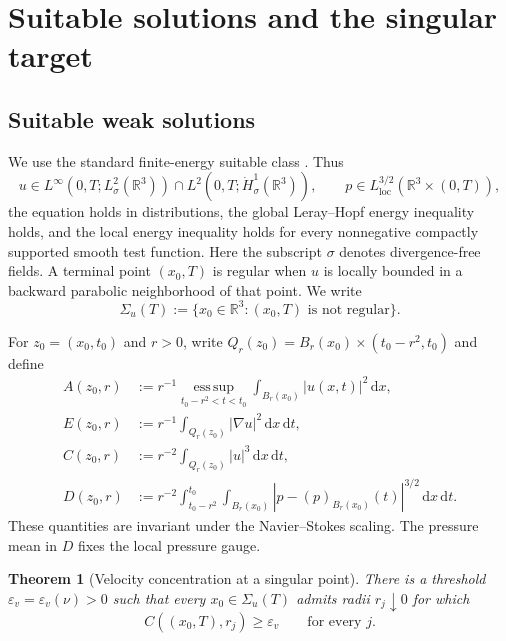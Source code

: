 \documentclass[11pt]{amsart}
\numberwithin{equation}{section}
\theoremstyle{plain}
\newtheorem{theorem}{Theorem}[section]
\theoremstyle{definition}
\theoremstyle{remark}
\newcommand{\R}{\mathbb R}
\newcommand{\dd}{\,\mathrm d}
\newcommand{\esssup}{\operatorname*{ess\,sup}}
\begin{document}
\section{Suitable solutions and the singular target}
\label{sec:singular-target}

\subsection{Suitable weak solutions}

We use the standard finite-energy suitable class
\cite{Leray1934,CaffarelliKohnNirenberg1982,Lin1998}.  Thus
\begin{equation}\label{eq:suitable-class}
 u\in L^\infty(0,T;L^2_\sigma(\R^3))
 \cap L^2(0,T;\dot H^1_\sigma(\R^3)),
 \qquad p\in L^{3/2}_{\mathrm{loc}}(\R^3\times(0,T)),
\end{equation}
the equation holds in distributions, the global Leray--Hopf energy inequality
holds, and the local energy inequality holds for every nonnegative compactly
supported smooth test function.  Here the subscript \(\sigma\) denotes
divergence-free fields.  A terminal point
\((x_0,T)\) is regular when \(u\) is locally bounded in a backward
parabolic neighborhood of that point.  We write
\begin{equation}\label{eq:singular-set}
 \Sigma_u(T):=\{x_0\in\R^3:(x_0,T)\text{ is not regular}\}.
\end{equation}

For \(z_0=(x_0,t_0)\) and \(r>0\), write
\(Q_r(z_0)=B_r(x_0)\times(t_0-r^2,t_0)\) and define
\begin{align}
 A(z_0,r)
 &:=r^{-1}\esssup_{t_0-r^2<t<t_0}
       \int_{B_r(x_0)}|u(x,t)|^2\dd x,\label{eq:A-def}\\
 E(z_0,r)
 &:=r^{-1}\int_{Q_r(z_0)}|\nabla u|^2\dd x\dd t,\label{eq:E-def}\\
 C(z_0,r)
 &:=r^{-2}\int_{Q_r(z_0)}|u|^3\dd x\dd t,\label{eq:C-def}\\
 D(z_0,r)
 &:=r^{-2}\int_{t_0-r^2}^{t_0}\int_{B_r(x_0)}
   |p-(p)_{B_r(x_0)}(t)|^{3/2}\dd x\dd t.\label{eq:D-def}
\end{align}
These quantities are invariant under the Navier--Stokes scaling.  The
pressure mean in \(D\) fixes the local pressure gauge.

\begin{theorem}[Velocity concentration at a singular point]
\label{thm:velocity-concentration}
There is a threshold \(\varepsilon_v=\varepsilon_v(\nu)>0\) such that every
\(x_0\in\Sigma_u(T)\) admits radii \(r_j\downarrow0\) for which
\begin{equation}\label{eq:velocity-concentration}
 C((x_0,T),r_j)\ge\varepsilon_v
 \qquad\text{for every }j.
\end{equation}
\end{theorem}
\end{document}

